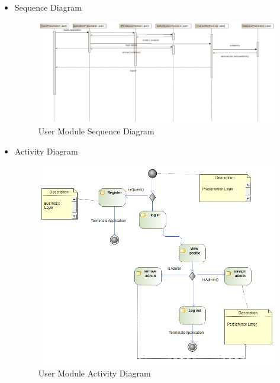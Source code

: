 \documentclass{article}
\begin{document}
\begin{itemize}
				\item Sequence Diagram				
 				\begin{center}
 					\begin{figure}[!h]
 						\includegraphics[scale=0.4]{isdu.png}
 						\caption{User Module Sequence Diagram}
 					\end{figure}
 				\end{center}
 				
 				\item Activity Diagram
 				\begin{center}
 					\begin{figure}[!h]
 						\includegraphics[scale=0.4]{uad.png}
 						\caption{User Module Activity Diagram}
 					\end{figure}
 				\end{center}
 				\pagebreak
 				

\end{itemize}
\end{document}
